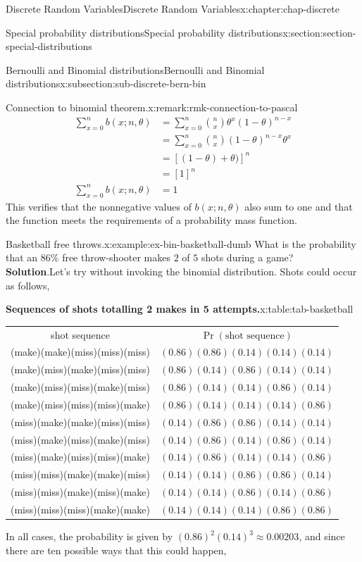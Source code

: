 \documentclass[oneside,10pt,]{book}
\newcommand{\blocktitlefont}{\relax}
\newcommand{\tabularfont}{\relax}
\numberwithin{equation}{section}
\newcommand{\hrulemedium}{\noalign{\hrule height 0.07em}}
\newcommand{\amp}{&}
\begin{document}
\begin{chapterptx}{Discrete Random Variables}{}{Discrete Random Variables}{}{}{x:chapter:chap-discrete}
\begin{sectionptx}{Special probability distributions}{}{Special probability distributions}{}{}{x:section:section-special-distributions}
\begin{subsectionptx}{Bernoulli and Binomial distributions}{}{Bernoulli and Binomial distributions}{}{}{x:subsection:sub-discrete-bern-bin}
\begin{remark}{Connection to binomial theorem.}{x:remark:rmk-connection-to-pascal}
\begin{align*}
\sum\limits_{x=0}^n b(x; n, \theta) \amp = \sum\limits_{x=0}^n {n \choose x}\theta^{x}(1-\theta)^{n-x} \\
\ \amp = \sum\limits_{x=0}^n {n \choose x}(1-\theta)^{n-x}\theta^{x} \\
\amp = \left[(1-\theta) + \theta)\right]^{n} \\
\amp = \left[1\right]^{n} \\
\sum\limits_{x=0}^n b(x; n, \theta) \amp = 1 
\end{align*}
This verifies that the nonnegative values of \(b(x; n, \theta)\) also sum to one and that the function meets the requirements of a probability mass function.%
\end{remark}
\begin{example}{Basketball free throws.}{x:example:ex-bin-basketball-dumb}%
What is the probability that an \(86\%\) free throw-shooter makes \(2\) of \(5\) shots during a game?%
\textbf{\blocktitlefont Solution}.\quad{}Let's try without invoking the binomial distribution.  Shots could occur as follows, \begin{tableptx}{\textbf{Sequences of shots totalling 2 makes in 5 attempts.}}{x:table:tab-basketball}{}%
\centering
{\tabularfont%
\begin{tabular}{ll}
\multicolumn{1}{c}{shot sequence}&\multicolumn{1}{c}{\(\operatorname{Pr}(\text{shot sequence})\)}\tabularnewline\hrulemedium
(make)(make)(miss)(miss)(miss)&\((0.86)(0.86)(0.14)(0.14)(0.14)\)\tabularnewline[0pt]
(make)(miss)(make)(miss)(miss)&\((0.86)(0.14)(0.86)(0.14)(0.14)\)\tabularnewline[0pt]
(make)(miss)(miss)(make)(miss)&\((0.86)(0.14)(0.14)(0.86)(0.14)\)\tabularnewline[0pt]
(make)(miss)(miss)(miss)(make)&\((0.86)(0.14)(0.14)(0.14)(0.86)\)\tabularnewline[0pt]
(miss)(make)(make)(miss)(miss)&\((0.14)(0.86)(0.86)(0.14)(0.14)\)\tabularnewline[0pt]
(miss)(make)(miss)(make)(miss)&\((0.14)(0.86)(0.14)(0.86)(0.14)\)\tabularnewline[0pt]
(miss)(make)(miss)(miss)(make)&\((0.14)(0.86)(0.14)(0.14)(0.86)\)\tabularnewline[0pt]
(miss)(miss)(make)(make)(miss)&\((0.14)(0.14)(0.86)(0.86)(0.14)\)\tabularnewline[0pt]
(miss)(miss)(make)(miss)(make)&\((0.14)(0.14)(0.86)(0.14)(0.86)\)\tabularnewline[0pt]
(miss)(miss)(miss)(make)(make)&\((0.14)(0.14)(0.14)(0.86)(0.86)\)
\end{tabular}
}%
\end{tableptx}%
%
\par
In all cases, the probability is given by \((0.86)^2(0.14)^3 \approx 0.00203\), and since there are ten possible ways that this could happen,%
\begin{equation*}

\end{equation*}
\end{example}
\end{subsectionptx}
\end{sectionptx}
\end{chapterptx}
\end{document}
